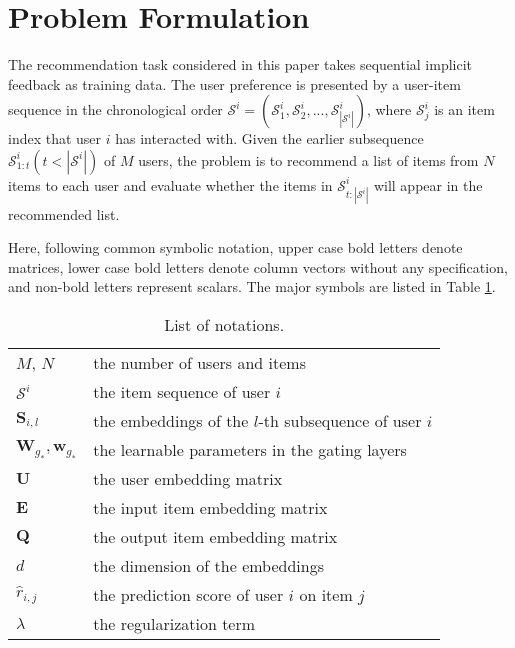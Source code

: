 \documentclass[sigconf]{acmart}
\begin{document}
\section{Problem Formulation}
The recommendation task considered in this paper takes sequential implicit feedback as training data. The user preference is presented by a user-item sequence in the chronological order $ \mathcal{S}^{i}=(\mathcal{S}_{1}^{i}, \mathcal{S}_{2}^{i},...,\mathcal{S}_{|\mathcal{S}^{i}|}^{i}) $, where $ \mathcal{S}_{j}^{i} $ is an item index that user $ i $ has interacted with. Given the earlier subsequence $ \mathcal{S}^{i}_{1:t} (t < |\mathcal{S}^{i}|) $ of $ M $ users, the problem is to recommend a list of items from $ N $ items to each user and evaluate whether the items in $ \mathcal{S}^{i}_{t:|\mathcal{S}^{i}|} $ will appear in the recommended list.

Here, following common symbolic notation, upper case bold letters denote matrices, lower case bold letters denote column vectors without any specification, and non-bold letters represent scalars. The major symbols are listed in Table \ref{tab:notations}.

\begin{table}[ht]
\centering
\caption{List of notations.}
\label{tab:notations}
\begin{tabular}{ll}
 \hline
$ M $, $ N $ & the number of users and items \\
$ \mathcal{S}^{i} $ & the item sequence of user $ i $ \\
$ \mathbf{S}_{i,l} $ & the embeddings of the $ l $-th subsequence of user $ i $ \\
$ \mathbf{W}_{g_{*}}, \mathbf{w}_{g_{*}} $ & the learnable parameters in the gating layers \\
$ \mathbf{U} $ & the user embedding matrix \\
$ \mathbf{E} $ & the input item embedding matrix \\
$ \mathbf{Q} $ & the output item embedding matrix \\
$ d $ & the dimension of the embeddings \\
$ \hat{r}_{i, j} $ & the prediction score of user $ i $ on item $ j $ \\
$ \lambda $ & the regularization term \\ \hline
\end{tabular}
\vspace{-0.3cm}
\end{table}
\end{document}
